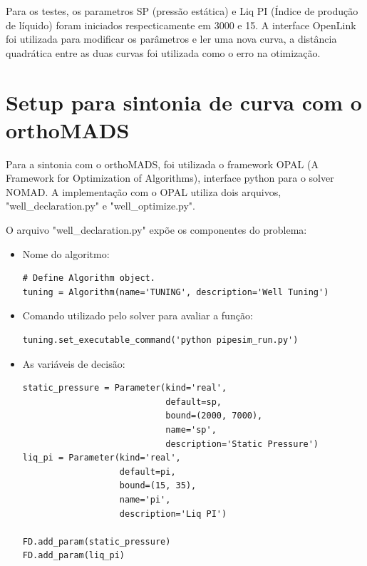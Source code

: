 Para os testes, os parametros SP (pressão estática) e Liq PI (Índice de produção de líquido) foram iniciados respecticamente em 3000 e 15. A interface OpenLink foi utilizada para modificar os parâmetros e ler uma nova curva, a distância quadrática entre as duas curvas foi utilizada como o erro na otimização.

\section{Setup para sintonia de curva com o orthoMADS}
Para a sintonia com o orthoMADS, foi utilizada o framework OPAL (A Framework for Optimization of Algorithms), interface python para o solver NOMAD.
A implementação com o OPAL utiliza dois arquivos, "well\_declaration.py" e "well\_optimize.py".

O arquivo "well\_declaration.py" expõe os componentes do problema:

\begin{itemize}
\item Nome do algoritmo:
\begin{verbatim}
# Define Algorithm object.
tuning = Algorithm(name='TUNING', description='Well Tuning')
\end{verbatim}
\end{itemize}

\begin{itemize}
\item Comando utilizado pelo solver para avaliar a função:
\begin{verbatim}
tuning.set_executable_command('python pipesim_run.py')
\end{verbatim}
\end{itemize}


\begin{itemize}
\item As variáveis de decisão:
\begin{verbatim}
static_pressure = Parameter(kind='real', 
                            default=sp, 
                            bound=(2000, 7000),
                            name='sp', 
                            description='Static Pressure')
liq_pi = Parameter(kind='real', 
                   default=pi, 
                   bound=(15, 35),
                   name='pi', 
                   description='Liq PI')

FD.add_param(static_pressure)
FD.add_param(liq_pi)
\end{verbatim}
\end{itemize}


